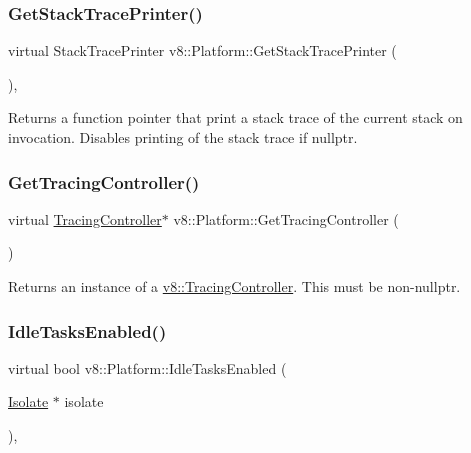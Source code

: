\subsubsection{\texorpdfstring{Get\+Stack\+Trace\+Printer()}{GetStackTracePrinter()}}
{\footnotesize\ttfamily virtual Stack\+Trace\+Printer v8\+::\+Platform\+::\+Get\+Stack\+Trace\+Printer (\begin{DoxyParamCaption}{ }\end{DoxyParamCaption})\hspace{0.3cm}{\ttfamily [inline]}, {\ttfamily [virtual]}}

Returns a function pointer that print a stack trace of the current stack on invocation. Disables printing of the stack trace if nullptr. \mbox{\label{classv8_1_1Platform_aa760c7bf8c46495eb650d2be72399747}} 
\subsubsection{\texorpdfstring{Get\+Tracing\+Controller()}{GetTracingController()}}
{\footnotesize\ttfamily virtual \mbox{\hyperlink{classv8_1_1TracingController}{Tracing\+Controller}}$\ast$ v8\+::\+Platform\+::\+Get\+Tracing\+Controller (\begin{DoxyParamCaption}{ }\end{DoxyParamCaption})\hspace{0.3cm}{\ttfamily [pure virtual]}}

Returns an instance of a \mbox{\hyperlink{classv8_1_1TracingController}{v8\+::\+Tracing\+Controller}}. This must be non-\/nullptr. \mbox{\label{classv8_1_1Platform_ad229642bf16a066d2e8d866dc128141e}} 
\subsubsection{\texorpdfstring{Idle\+Tasks\+Enabled()}{IdleTasksEnabled()}}
{\footnotesize\ttfamily virtual bool v8\+::\+Platform\+::\+Idle\+Tasks\+Enabled (\begin{DoxyParamCaption}\item[{\mbox{\hyperlink{classv8_1_1Isolate}{Isolate}} $\ast$}]{isolate }\end{DoxyParamCaption})\hspace{0.3cm}{\ttfamily [inline]}, {\ttfamily [virtual]}}

